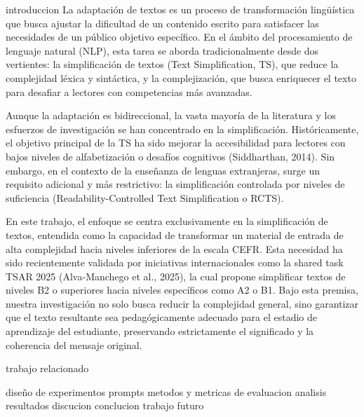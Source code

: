 introduccion
La adaptación de textos es un proceso de transformación lingüística que busca ajustar la dificultad de un contenido escrito para satisfacer las necesidades de un público objetivo específico. En el ámbito del procesamiento de lenguaje natural (NLP), esta tarea se aborda tradicionalmente desde dos vertientes: la simplificación de textos (Text Simplification, TS), que reduce la complejidad léxica y sintáctica, y la complejización, que busca enriquecer el texto para desafiar a lectores con competencias más avanzadas.

Aunque la adaptación es bidireccional, la vasta mayoría de la literatura y los esfuerzos de investigación se han concentrado en la simplificación. Históricamente, el objetivo principal de la TS ha sido mejorar la accesibilidad para lectores con bajos niveles de alfabetización o desafíos cognitivos (Siddharthan, 2014). Sin embargo, en el contexto de la enseñanza de lenguas extranjeras, surge un requisito adicional y más restrictivo: la simplificación controlada por niveles de suficiencia (Readability-Controlled Text Simplification o RCTS).

En este trabajo, el enfoque se centra exclusivamente en la simplificación de textos, entendida como la capacidad de transformar un material de entrada de alta complejidad hacia niveles inferiores de la escala CEFR. Esta necesidad ha sido recientemente validada por iniciativas internacionales como la shared task TSAR 2025 (Alva-Manchego et al., 2025), la cual propone simplificar textos de niveles B2 o superiores hacia niveles específicos como A2 o B1. Bajo esta premisa, nuestra investigación no solo busca reducir la complejidad general, sino garantizar que el texto resultante sea pedagógicamente adecuado para el estadio de aprendizaje del estudiante, preservando estrictamente el significado y la coherencia del mensaje original.

trabajo relacionado

diseño de experimentos
prompts
metodos y metricas de evaluacion
analisis resultados
discucion
conclucion
trabajo futuro